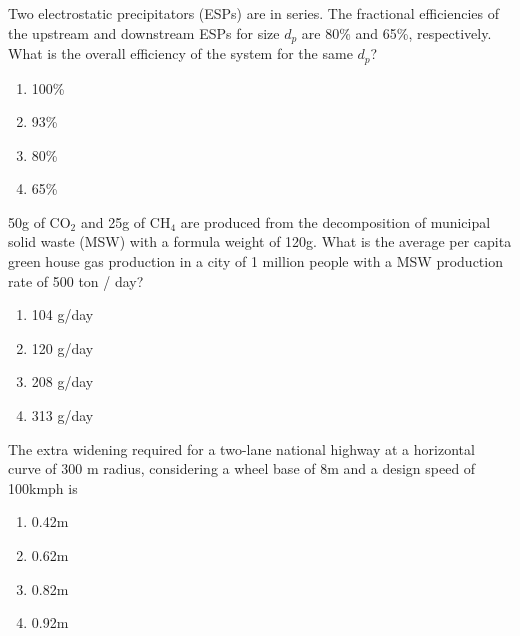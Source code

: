  	\item{
			Two electrostatic precipitators (ESPs) are in series. The fractional efficiencies of the upstream and downstream ESPs for size $d_p$ are 80\% and 65\%, respectively. What is the overall efficiency of the system for the same $d_p$?
			\hfill
			
			
			\begin{multicols}{4}
				\begin{enumerate}
					\item 100\%
					\item 93\%
					\item 80\%
					\item 65\%
				\end{enumerate}
			\end{multicols}
			
		}
 	\item{
			50g of CO$_2$ and 25g of CH$_4$ are produced from the decomposition of municipal solid waste (MSW) with a formula weight of 120g. What is the average per capita green house gas production in a city of 1 million people with a MSW production rate of 500 ton / day?\text{ }
			\hfill
			
			
			\begin{multicols}{2}
				\begin{enumerate}
					\item 104 g/day 
					\item 120 g/day 
					\item 208 g/day 
					\item 313 g/day 
				\end{enumerate}
			\end{multicols}
			
		}
    \item{
            The extra widening required for a two-lane national highway at a horizontal curve of 300 m radius, considering a wheel base of 8m and a design speed of 100kmph is\text{ }
             \hfill
                
            \begin{multicols}{4}
                \begin{enumerate}
                	\item 0.42m
                	\item 0.62m
                	\item 0.82m
                	\item 0.92m
                \end{enumerate}
            \end{multicols}

        
        }
